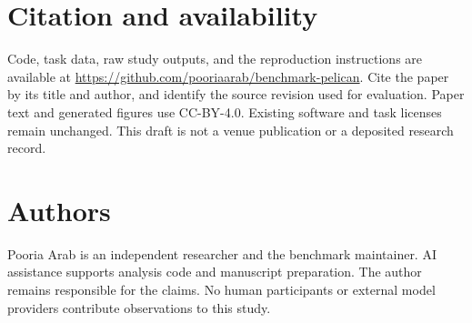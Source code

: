 \documentclass{article}
\begin{document}
\section{Citation and availability}
Code, task data, raw study outputs, and the reproduction instructions are available at \url{https://github.com/pooriaarab/benchmark-pelican}. Cite the paper by its title and author, and identify the source revision used for evaluation. Paper text and generated figures use CC-BY-4.0. Existing software and task licenses remain unchanged. This draft is not a venue publication or a deposited research record.

\section{Authors}
Pooria Arab is an independent researcher and the benchmark maintainer. AI assistance supports analysis code and manuscript preparation. The author remains responsible for the claims. No human participants or external model providers contribute observations to this study.



\end{document}

